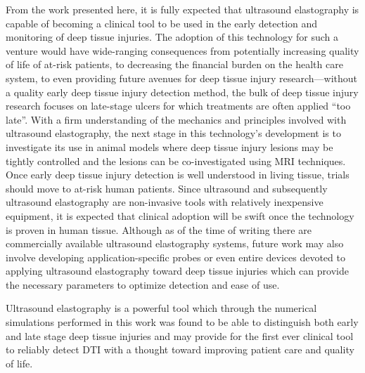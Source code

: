 		From the work presented here, it is fully expected that ultrasound elastography is capable of becoming a clinical tool to be used in the early detection and monitoring of deep tissue injuries. The adoption of this technology for such a venture would have wide-ranging consequences from potentially increasing quality of life of at-risk patients, to decreasing the financial burden on the health care system, to even providing future avenues for deep tissue injury research---without a quality early deep tissue injury detection method, the bulk of deep tissue injury research focuses on late-stage ulcers for which treatments are often applied ``too late''. With a firm understanding of the mechanics and principles involved with ultrasound elastography, the next stage in this technology's development is to investigate its use in animal models where deep tissue injury lesions may be tightly controlled and the lesions can be co-investigated using MRI techniques. Once early deep tissue injury detection is well understood in living tissue, trials should move to at-risk human patients. Since ultrasound and subsequently ultrasound elastography are non-invasive tools with relatively inexpensive equipment, it is expected that clinical adoption will be swift once the technology is proven in human tissue. Although as of the time of writing there are commercially available ultrasound elastography systems, future work may also involve developing application-specific probes or even entire devices devoted to applying ultrasound elastography toward deep tissue injuries which can provide the necessary parameters to optimize detection and ease of use.

		Ultrasound elastography is a powerful tool which through the numerical simulations performed in this work was found to be able to distinguish both early and late stage deep tissue injuries and may provide for the first ever clinical tool to reliably detect DTI with a thought toward improving patient care and quality of life.

